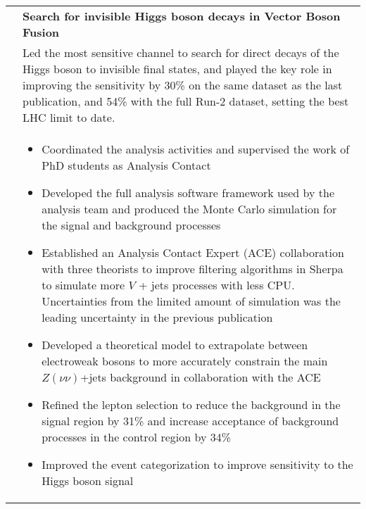 \documentclass[a4paper,10pt]{article}
\begin{document}
\begin{tabularx}{\textwidth}{>{\centering\arraybackslash}X p{} }
{\bf Analysis} &  \textbf{Search for invisible Higgs boson decays in Vector Boson Fusion} \\
			   & Led the most sensitive channel to search for direct decays of the Higgs boson to invisible final states, and played the key role in improving the sensitivity by 30\% on the same dataset as the last publication, and 54\% with the full Run-2 dataset, setting the best
         LHC limit to date. \\
			   & \begin{itemize}
         \item Coordinated the analysis activities and supervised the work of PhD students as Analysis Contact
			   \item Developed the full analysis software framework used by the analysis team and produced the Monte Carlo simulation for the signal and background processes
			   \item Established an Analysis Contact Expert (ACE) collaboration with three theorists to improve filtering algorithms in Sherpa to simulate more $V$ + jets processes with less CPU. Uncertainties from the limited amount of simulation was the leading uncertainty in the previous publication
				\item Developed a theoretical model to extrapolate between electroweak bosons to more accurately constrain the main $Z\left(\nu\nu\right)$+jets background in collaboration with the ACE
				\item Refined the lepton selection to reduce the background in the signal region by 31\% and increase acceptance of background processes in the control region by 34\%
				\item Improved the event categorization to improve sensitivity to the Higgs boson signal
			  \end{itemize}\\[-1.5ex]
\end{tabularx}


\vspace{3mm}
\end{document}
